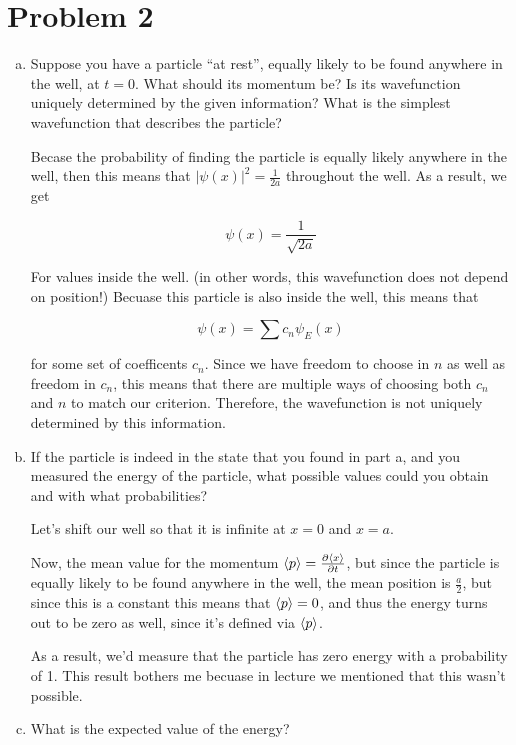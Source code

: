 \documentclass{article}
\begin{document}
    \pagebreak
    \section*{Problem 2}
    \begin{enumerate}[(a)]
    \item Suppose you have a particle ``at rest'', equally likely to be found anywhere in the well, at $t = 0$. What should its momentum be? Is its wavefunction uniquely determined by the given information? What is the simplest wavefunction that describes the particle?
    
    \begin{solution}
        Becase the probability of finding the particle is equally likely anywhere in the well, then this means that $|\psi(x)|^2 = \frac{1}{2a}$ throughout the well. As a result, we get 

        \[ \psi(x) = \frac{1}{\sqrt{2a}}\] 

        For values inside the well. (in other words, this wavefunction does not depend on position!) Becuase this particle is also inside the well, this means that 

        \[ \psi(x) = \sum c_n \psi_E(x)\]

        for some set of coefficents $c_n$. Since we have freedom to choose in $n$ as well as freedom in $c_n$, this means that there are multiple ways of choosing both $c_n$ and $n$ to match our criterion. Therefore, the wavefunction is not uniquely determined by this information.
    \end{solution}
    \item If the particle is indeed in the state that you found in part a, and you measured the energy of the particle, what possible values could you obtain and with what probabilities?
    
    \begin{solution}

        Let's shift our well so that it is infinite at $x = 0$ and $x = a$.

        Now, the mean value for the momentum $\langle p \rangle = \frac{\partial \langle x \rangle}{\partial t}$, but since the particle is equally likely to be found anywhere in the well, the mean position is $\frac{a}{2}$, but since this is a constant this means that $\langle p \rangle = 0$, and thus the energy turns out to be zero as well, since it's defined via $\langle p \rangle$.

        As a result, we'd measure that the particle has zero energy with a probability of 1. This result bothers me becuase in lecture we mentioned that this wasn't possible.
    \end{solution}
    \item What is the expected value of the energy?
    

\end{enumerate}
\end{document}
